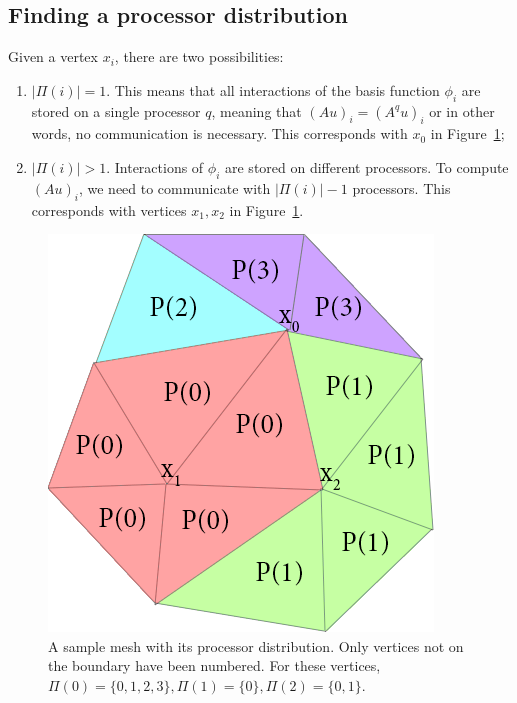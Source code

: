 \documentclass[11pt]{amsart}
\theoremstyle{definition}
\begin{document}
\subsection{Finding a processor distribution}
Given a vertex $x_i$, there are two possibilities:
\begin{enumerate}
  \item $|\Pi(i)| = 1$. This means that all interactions of the basis function $\phi_i$ are stored on a single processor $q$, meaning that $(Au)_i = (A^qu)_i$ or in other words, no communication is necessary. This corresponds with $x_0$ in Figure~\ref{fig:procset};
  \item $|\Pi(i)| > 1$. Interactions of $\phi_i$ are stored on different processors. To compute $(Au)_i$, we need to communicate with $|\Pi(i)|-1$ processors. This corresponds with vertices $x_1, x_2$ in Figure~\ref{fig:procset}.
\end{enumerate}

\begin{figure}
  \includegraphics[width=0.5\linewidth]{procset.png}
  \caption{A sample mesh with its processor distribution. Only vertices not on the boundary have been numbered. For these vertices, $\Pi(0) = \{0, 1, 2, 3\}, \Pi(1) = \{0\}, \Pi(2) = \{0, 1\}$.}
  \label{fig:procset}
\end{figure}
\end{document}
